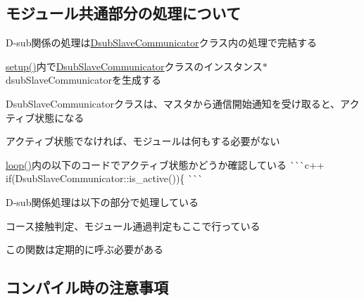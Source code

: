 \subsection*{モジュール共通部分の処理について}


\begin{DoxyItemize}
\item D-\/sub関係の処理は{\ttfamily \mbox{\hyperlink{class_dsub_slave_communicator}{Dsub\+Slave\+Communicator}}}クラス内の処理で完結する
\item {\ttfamily \mbox{\hyperlink{slave__template_8ino_a7dfd9b79bc5a37d7df40207afbc5431f}{setup()}}}内で{\ttfamily \mbox{\hyperlink{class_dsub_slave_communicator}{Dsub\+Slave\+Communicator}}}クラスのインスタンス{\ttfamily $\ast$dsub\+Slave\+Communicator}を生成する
\item Dsub\+Slave\+Communicatorクラスは、マスタから通信開始通知を受け取ると、アクティブ状態になる
\item アクティブ状態でなければ、モジュールは何もする必要がない
\begin{DoxyItemize}
\item {\ttfamily \mbox{\hyperlink{slave__template_8ino_a0b33edabd7f1c4e4a0bf32c67269be2f}{loop()}}}内の以下のコードでアクティブ状態かどうか確認している \`{}\`{}\`{}c++ if(\+Dsub\+Slave\+Communicator\+::is\+\_\+active())\{ \`{}\`{}\`{}
\end{DoxyItemize}
\item D-\/sub関係処理は以下の部分で処理している 
\begin{DoxyCode}{0}
\end{DoxyCode}

\begin{DoxyItemize}
\item コース接触判定、モジュール通過判定もここで行っている
\item この関数は定期的に呼ぶ必要がある
\end{DoxyItemize}
\end{DoxyItemize}

\subsection*{コンパイル時の注意事項}


